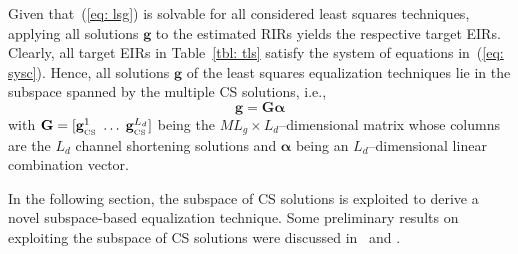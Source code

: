 \documentclass[10pt]{IEEEtran}
\begin{document}
Given that~(\ref{eq: lsg}) is solvable for all considered least squares techniques, applying all solutions $\mathbf{g}$ to the estimated RIRs yields the respective target EIRs.  
Clearly, all target EIRs in Table~\ref{tbl: tls} satisfy the system of equations in~(\ref{eq: sysc}).
Hence, all solutions $\mathbf{g}$ of the least squares equalization techniques lie in the subspace spanned by the multiple CS solutions, i.e., 
\begin{equation}
\boxed{\mathbf{g} = \mathbf{G} \boldsymbol \alpha}
\end{equation}
with $\mathbf{G} = [\mathbf{g}_{_{\rm CS}}^1 \; \ldots \; \mathbf{g}_{_{\rm CS}}^{L_d}]$ being the $ML_g \times L_d$--dimensional matrix whose columns are the $L_d$ channel shortening solutions and $\boldsymbol \alpha$ being an $L_d$--dimensional linear combination vector.

In the following section, the subspace of CS solutions is exploited to derive a novel subspace-based equalization technique. 
Some preliminary results on exploiting the subspace of CS solutions were discussed in~\cite{Kodrasi_ICASSP_2013} and \cite{Kodrasi_EUSIPCO_2013}.
\end{document}

